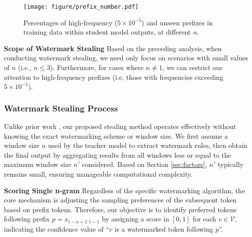 

\begin{figure}[t]
    \centering
    \texttt{[image: figure/prefix\_number.pdf]}
    \caption{Percentages of high-frequency ($5\times 10^{-5}$) and unseen prefixes in training data within student model outputs, at different $n$.}
    \label{fig:prefix_num}
    \vspace{-10pt}
\end{figure}

\vspace{3pt}

\noindent\textbf{Scope of Watermark Stealing} \quad Based on the preceding analysis, when conducting watermark stealing, we need only focus on scenarios with small values of $n$ (i.e., $n \leq 3$). Furthermore, for cases where $n \neq 1$, we can restrict our attention to high-frequency prefixes (i.e. those with frequencies exceeding $5 \times 10^{-5}$).

\subsubsection{Watermark Stealing Process}
\label{sec:stealing}
Unlike prior work \cite{jovanovicwatermark,wu-chandrasekaran-2024-bypassing,zhang2024large}, our proposed stealing method operates effectively without knowing the exact watermarking scheme or window size. We first assume a window size $n$ used by the teacher model to extract watermark rules, then obtain the final output by aggregating results from all windows less or equal to the maximum window size $n'$ considered. Based on Section \ref{sec:factors}, $n'$ typically remains small, ensuring manageable computational complexity.

\noindent\textbf{Scoring Single n-gram} \quad Regardless of the specific watermarking algorithm, the core mechanism is adjusting the sampling preferences of the subsequent token based on prefix tokens. Therefore, our objective is to identify preferred tokens following prefix $p=x_{t-n+1:t-1}$ by assigning a score in $[0,1]$ for each $v \in \mathcal{V}$, indicating the confidence value of ``$v$ is a watermarked token following $p$''.

